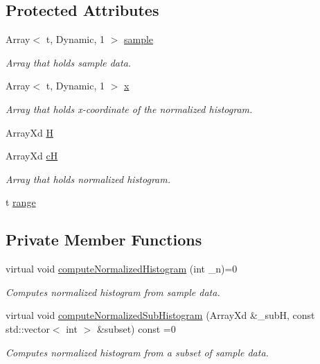 \subsection*{Protected Attributes}
\begin{DoxyCompactItemize}
\item 
Array$<$ t, Dynamic, 1 $>$ \hyperlink{class_t_sample_a86a1507fc39a77dd81c298a420d47d27}{sample}
\begin{DoxyCompactList}\small\item\em Array that holds sample data. \end{DoxyCompactList}\item 
Array$<$ t, Dynamic, 1 $>$ \hyperlink{class_t_sample_ab6b31fdfd8547fb15df70eac7f6b84e3}{x}
\begin{DoxyCompactList}\small\item\em Array that holds x-\/coordinate of the normalized histogram. \end{DoxyCompactList}\item 
Array\-Xd \hyperlink{class_t_sample_a95cd9ef96fc962a75c1bd1a54e7ed792}{H}
\item 
Array\-Xd \hyperlink{class_t_sample_aedda743fb903732544bf50bdc57ffcee}{c\-H}
\begin{DoxyCompactList}\small\item\em Array that holds normalized histogram. \end{DoxyCompactList}\item 
t \hyperlink{class_t_sample_ae92afde393f607aa4bb3db700be0d741}{range}
\end{DoxyCompactItemize}
\subsection*{Private Member Functions}
\begin{DoxyCompactItemize}
\item 
virtual void \hyperlink{class_t_sample_aa77e238967d85f6c6a66e74a52a600b8}{compute\-Normalized\-Histogram} (int \-\_\-n)=0
\begin{DoxyCompactList}\small\item\em Computes normalized histogram from sample data. \end{DoxyCompactList}\item 
virtual void \hyperlink{class_t_sample_af2d1a245bc880db839de38acbb7f2f84}{compute\-Normalized\-Sub\-Histogram} (Array\-Xd \&\-\_\-sub\-H, const std\-::vector$<$ int $>$ \&subset) const =0
\begin{DoxyCompactList}\small\item\em Computes normalized histogram from a subset of sample data. \end{DoxyCompactList}\end{DoxyCompactItemize}
